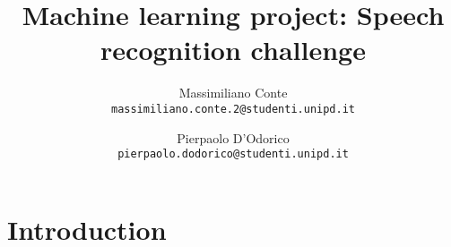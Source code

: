 \documentclass[10pt,twocolumn,letterpaper]{article}
\begin{document}
\title{Machine learning project: Speech recognition challenge}

\author{Massimiliano Conte\\
{\tt\small massimiliano.conte.2@studenti.unipd.it}
\and
Pierpaolo D'Odorico\\
{\tt\small pierpaolo.dodorico@studenti.unipd.it}
}

\maketitle


\section{Introduction}
\end{document}
